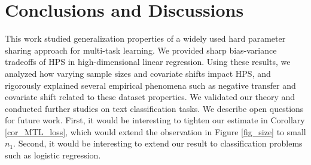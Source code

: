 \vspace{-0.06in}
\section{Conclusions and Discussions}\label{sec_conclude}
\vspace{-0.06in}

This work studied  generalization properties of a widely used hard parameter sharing approach for multi-task learning.
We provided sharp bias-variance tradeoffs of HPS in high-dimensional linear regression.
Using these results, we analyzed how varying sample sizes and covariate shifts impact HPS, and rigorously explained several empirical phenomena such as negative transfer and covariate shift related to these dataset properties.
We validated our theory and conducted further studies on text classification tasks.
We describe open questions for future work.
First, it would be interesting to tighten our estimate in Corollary \ref{cor_MTL_loss}, which would extend the observation in Figure \ref{fig_size} to small $n_1$.
Second, it would be interesting to extend our result to classification problems such as logistic regression.

